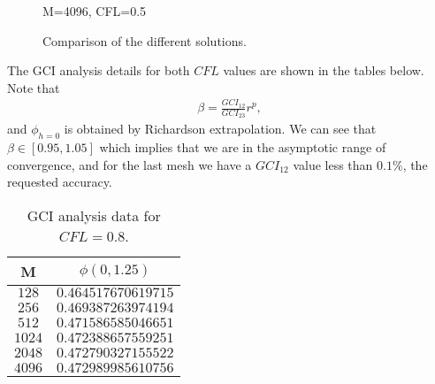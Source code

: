 \begin{figure}[H]
\centering     %
\hspace*{\fill}
\hfill
{}
\hspace*{\fill}

\hspace*{\fill}
\hfill
{}
\hspace*{\fill}

\hspace*{\fill}
\hfill
{}
\hspace*{\fill}
\caption{M=4096, CFL=0.5}
\end{figure}

\begin{figure}[H]
\centering     %
\hspace*{\fill}
\hfill
{}
\hspace*{\fill}
\hspace*{\fill}
\caption{Comparison of the different solutions.}
\end{figure}
The GCI analysis details for both $CFL$ values are shown in the tables below. Note that 
\begin{align*}
\beta=\frac{GCI_{12}}{GCI_{23}}r^p,
\end{align*}
and $\phi_{h=0}$ is obtained by Richardson extrapolation. We can see that $\beta\in[0.95,1.05]$ which implies that we are in the asymptotic range of convergence, and for the last mesh we have a $GCI_{12}$ value less than $0.1\%$, the requested accuracy.
\begin{table}[H]
\centering
\begin{tabular}{|c|c|}
M & $\phi(0,1.25)$ \\
\hline
$128$ & $0.464517670619715$ \\
$256$ & $0.469387263974194$ \\
$512$ & $0.471586585046651$ \\
$1024$ & $0.472388657559251$ \\
$2048$ & $0.472790327155522$ \\
$4096$ & $0.472989985610756$ \\
\end{tabular}
\caption{GCI analysis data for $CFL=0.8$.}
\end{table}

